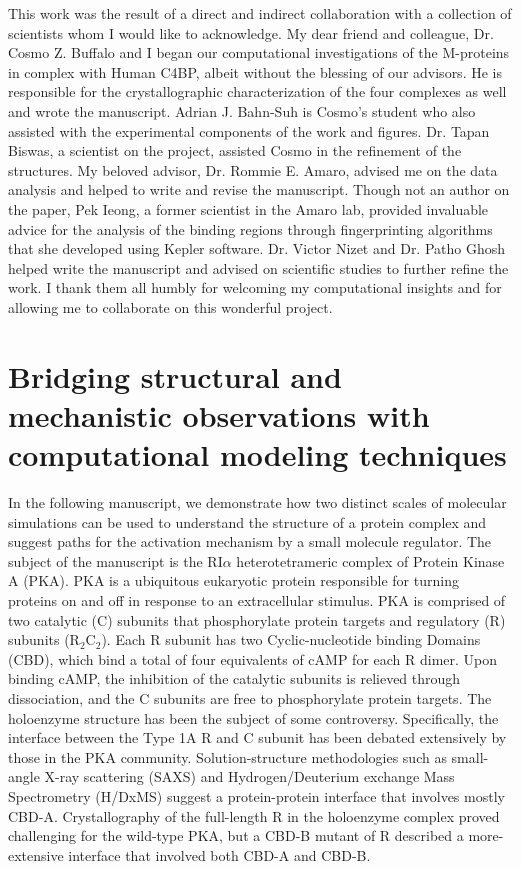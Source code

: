 \documentclass[12pt]{ucsddissertation}
\begin{document}
This work was the result of a direct and indirect collaboration with a collection of scientists whom I would like to acknowledge. My dear friend and colleague, Dr. Cosmo Z. Buffalo and I began our computational investigations of the M-proteins in complex with Human C4BP, albeit without the blessing of our advisors. He is responsible for the crystallographic characterization of the four complexes as well and wrote the manuscript. Adrian J. Bahn-Suh is Cosmo's student who also assisted with the experimental components of the work and figures. Dr. Tapan Biswas, a scientist on the project, assisted Cosmo in the refinement of the structures. My beloved advisor, Dr. Rommie E. Amaro, advised me on the data analysis and helped to write and revise the manuscript. Though not an author on the paper, Pek Ieong, a former scientist in the Amaro lab, provided invaluable advice for the analysis of the binding regions through fingerprinting algorithms that she developed using Kepler software. Dr. Victor Nizet and Dr. Patho Ghosh helped write the manuscript and advised on scientific studies to further refine the work. I thank them all humbly for welcoming my computational insights and for allowing me to collaborate on this wonderful project. 

\chapter{Bridging structural and mechanistic observations with computational modeling techniques}\label{first:paper}
\vspace*{-1.2cm}
In the following manuscript, we demonstrate how two distinct scales of molecular simulations can be used to understand the structure of a protein complex and suggest paths for the activation mechanism by a small molecule regulator. The subject of the manuscript is the RI$\alpha$ heterotetrameric complex of Protein Kinase A (PKA). PKA is a ubiquitous eukaryotic protein responsible for turning proteins on and off in response to an extracellular stimulus. PKA is comprised of two catalytic (C) subunits that phosphorylate protein targets and regulatory (R) subunits (R$_{2}$C$_{2}$). Each R subunit has two Cyclic-nucleotide binding Domains (CBD), which bind a total of four equivalents of cAMP for each R dimer. Upon binding cAMP, the inhibition of the catalytic subunits is relieved through dissociation, and the C subunits are free to phosphorylate protein targets. The holoenzyme structure has been the subject of some controversy. Specifically, the interface between the Type 1A R and C subunit has been debated extensively by those in the PKA community. Solution-structure methodologies such as small-angle X-ray scattering (SAXS) and Hydrogen/Deuterium exchange Mass Spectrometry (H/DxMS) suggest a protein-protein interface that involves mostly CBD-A. Crystallography of the full-length R in the holoenzyme complex proved challenging for the wild-type PKA, but a CBD-B mutant of R described a more-extensive interface that involved both CBD-A and CBD-B.
\end{document}
